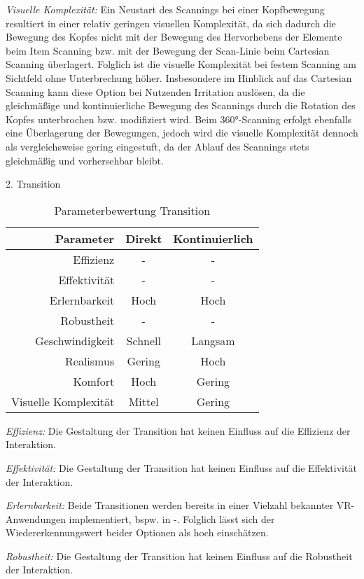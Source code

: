 \textit{Visuelle Komplexität:}
Ein Neustart des Scannings bei einer Kopfbewegung resultiert in einer relativ geringen visuellen Komplexität, da sich dadurch die Bewegung des Kopfes nicht mit der Bewegung des Hervorhebens der Elemente beim Item Scanning bzw. mit der Bewegung der Scan-Linie beim Cartesian Scanning überlagert. Folglich ist die visuelle Komplexität bei festem Scanning am Sichtfeld ohne Unterbrechung höher. Insbesondere im Hinblick auf das Cartesian Scanning kann diese Option bei Nutzenden Irritation auslösen, da die gleichmäßige und kontinuierliche Bewegung des Scannings durch die Rotation des Kopfes unterbrochen bzw. modifiziert wird. Beim 360°-Scanning erfolgt ebenfalls eine Überlagerung der Bewegungen, jedoch wird die visuelle Komplexität dennoch als vergleichsweise gering eingestuft, da der Ablauf des Scannings stets gleichmäßig und vorhersehbar bleibt. 

2. Transition 

\begin{table}[ht]
 \centering
 \begin{tabular}{r|c|c}
 Parameter & Direkt & Kontinuierlich\\
 \hline
 Effizienz & - & -\\
 Effektivität & - & -\\
 Erlernbarkeit & Hoch & Hoch\\
 Robustheit & - & -\\
 Geschwindigkeit & Schnell & Langsam\\
 Realismus & Gering & Hoch \\
 Komfort & Hoch & Gering\\
 Visuelle Komplexität & Mittel & Gering
 \end{tabular}
 \caption{Parameterbewertung Transition}
 \label{tab:Transition}
\end{table}

\textit{Effizienz:}
Die Gestaltung der Transition hat keinen Einfluss auf die Effizienz der Interaktion.

\textit{Effektivität:} 
Die Gestaltung der Transition hat keinen Einfluss auf die Effektivität der Interaktion.

\textit{Erlernbarkeit:}
Beide Transitionen werden bereits in einer Vielzahl bekannter VR-Anwendungen implementiert, bspw. in -. Folglich lässt sich der Wiedererkennungswert beider Optionen als hoch einschätzen. 

\textit{Robustheit:}
Die Gestaltung der Transition hat keinen Einfluss auf die Robustheit der Interaktion. 


